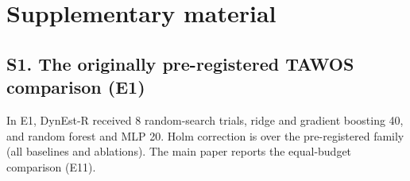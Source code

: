 \documentclass[11pt]{article}
\begin{document}
\section*{Supplementary material}

\subsection*{S1. The originally pre-registered TAWOS comparison (E1)}
In E1, DynEst-R received 8 random-search trials, ridge and gradient boosting 40, and random forest and MLP 20.
Holm correction is over the pre-registered family (all baselines and ablations).  The main paper reports the
equal-budget comparison (E11).


\end{document}
